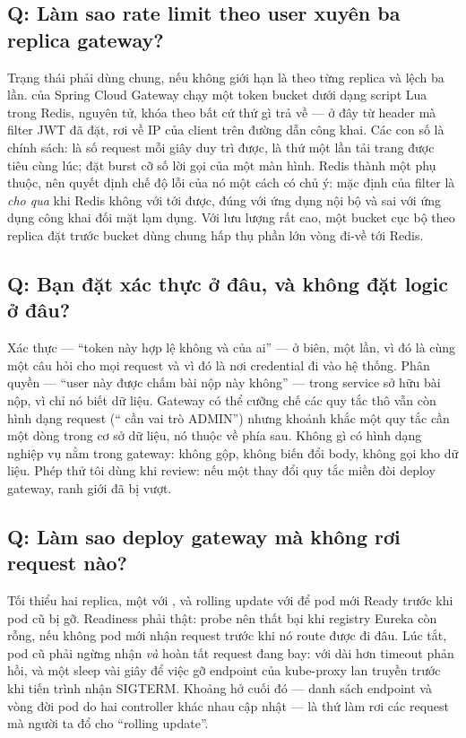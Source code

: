 \subsection*{Q: Làm sao rate limit theo user xuyên ba replica gateway?}

Trạng thái phải dùng chung, nếu không giới hạn là theo từng replica và
lệch ba lần.  của Spring Cloud Gateway chạy
một token bucket dưới dạng script Lua trong Redis, nguyên tử, khóa theo
bất cứ thứ gì  trả về --- ở đây  từ
header mà filter JWT đã đặt, rơi về IP của client trên đường dẫn công
khai. Các con số là chính sách:  là số request mỗi
giây duy trì được,  là thứ một lần tải trang được
tiêu cùng lúc; đặt burst cỡ số lời gọi của một màn hình. Redis thành
một phụ thuộc, nên quyết định chế độ lỗi của nó một cách có chủ ý: mặc
định của filter là \emph{cho qua} khi Redis không với tới được, đúng
với ứng dụng nội bộ và sai với ứng dụng công khai đối mặt lạm dụng. Với
lưu lượng rất cao, một bucket cục bộ theo replica đặt trước bucket dùng
chung hấp thụ phần lớn vòng đi-về tới Redis.

\subsection*{Q: Bạn đặt xác thực ở đâu, và không đặt logic ở đâu?}

Xác thực --- ``token này hợp lệ không và của ai'' --- ở biên, một lần,
vì đó là cùng một câu hỏi cho mọi request và vì đó là nơi credential đi
vào hệ thống. Phân quyền --- ``user này được chấm bài nộp này không''
--- trong service sở hữu bài nộp, vì chỉ nó biết dữ liệu. Gateway có
thể cưỡng chế các quy tắc thô vẫn còn hình dạng request
(`` cần vai trò ADMIN'') nhưng khoảnh khắc một quy
tắc cần một dòng trong cơ sở dữ liệu, nó thuộc về phía sau. Không gì có
hình dạng nghiệp vụ nằm trong gateway: không gộp, không biến đổi body,
không gọi kho dữ liệu. Phép thử tôi dùng khi review: nếu một thay đổi
quy tắc miền đòi deploy gateway, ranh giới đã bị vượt.

\subsection*{Q: Làm sao deploy gateway mà không rơi request nào?}

Tối thiểu hai replica, một  với
, và rolling update với 
để pod mới Ready trước khi pod cũ bị gỡ. Readiness phải thật: probe
nên thất bại khi registry Eureka còn rỗng, nếu không pod mới nhận
request trước khi nó route được đi đâu. Lúc tắt, pod cũ phải ngừng
nhận \emph{và} hoàn tất request đang bay:  với  dài
hơn timeout phản hồi, và một  sleep vài giây để việc gỡ
endpoint của kube-proxy lan truyền trước khi tiến trình nhận SIGTERM.
Khoảng hở cuối đó --- danh sách endpoint và vòng đời pod do hai
controller khác nhau cập nhật --- là thứ làm rơi các request mà người
ta đổ cho ``rolling update''.

